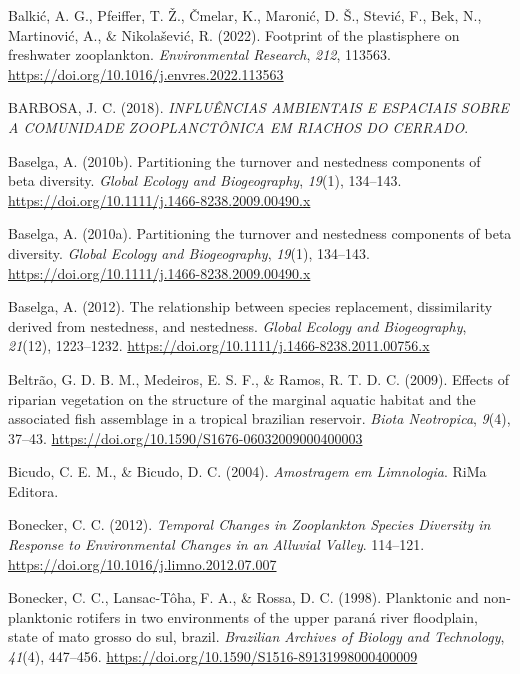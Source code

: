 \documentclass[
  letterpaper,
  DIV=11,
  numbers=noendperiod]{scrartcl}
\newlength{\cslhangindent}
\newenvironment{CSLReferences}[2] %
 {\begin{list}{}{%
  \setlength{\itemindent}{0pt}
  \setlength{\leftmargin}{0pt}
  \setlength{\parsep}{0pt}
  \ifodd #1
   \setlength{\leftmargin}{\cslhangindent}
   \setlength{\itemindent}{-1\cslhangindent}
  \fi
  \setlength{\itemsep}{#2\baselineskip}}}
 {\end{list}}
\begin{document}
\begin{CSLReferences}{1}{0}
Balkić, A. G., Pfeiffer, T. Ž., Čmelar, K., Maronić, D. Š., Stević, F.,
Bek, N., Martinović, A., \& Nikolašević, R. (2022). Footprint of the
plastisphere on freshwater zooplankton. \emph{Environmental Research},
\emph{212}, 113563. \url{https://doi.org/10.1016/j.envres.2022.113563}

BARBOSA, J. C. (2018). \emph{INFLUÊNCIAS AMBIENTAIS E ESPACIAIS SOBRE A
COMUNIDADE ZOOPLANCTÔNICA EM RIACHOS DO CERRADO}.

Baselga, A. (2010b). Partitioning the turnover and nestedness components
of beta diversity. \emph{Global Ecology and Biogeography}, \emph{19}(1),
134--143. \url{https://doi.org/10.1111/j.1466-8238.2009.00490.x}

Baselga, A. (2010a). Partitioning the turnover and nestedness components
of beta diversity. \emph{Global Ecology and Biogeography}, \emph{19}(1),
134--143. \url{https://doi.org/10.1111/j.1466-8238.2009.00490.x}

Baselga, A. (2012). The relationship between species replacement,
dissimilarity derived from nestedness, and nestedness. \emph{Global
Ecology and Biogeography}, \emph{21}(12), 1223--1232.
\url{https://doi.org/10.1111/j.1466-8238.2011.00756.x}

Beltrão, G. D. B. M., Medeiros, E. S. F., \& Ramos, R. T. D. C. (2009).
Effects of riparian vegetation on the structure of the marginal aquatic
habitat and the associated fish assemblage in a tropical brazilian
reservoir. \emph{Biota Neotropica}, \emph{9}(4), 37--43.
\url{https://doi.org/10.1590/S1676-06032009000400003}

Bicudo, C. E. M., \& Bicudo, D. C. (2004). \emph{Amostragem em
Limnologia}. RiMa Editora.

Bonecker, C. C. (2012). \emph{Temporal Changes in Zooplankton Species
Diversity in Response to Environmental Changes in an Alluvial Valley}.
114--121. \url{https://doi.org/10.1016/j.limno.2012.07.007}

Bonecker, C. C., Lansac-Tôha, F. A., \& Rossa, D. C. (1998). Planktonic
and non-planktonic rotifers in two environments of the upper paraná
river floodplain, state of mato grosso do sul, brazil. \emph{Brazilian
Archives of Biology and Technology}, \emph{41}(4), 447--456.
\url{https://doi.org/10.1590/S1516-89131998000400009}


\end{CSLReferences}
\end{document}
